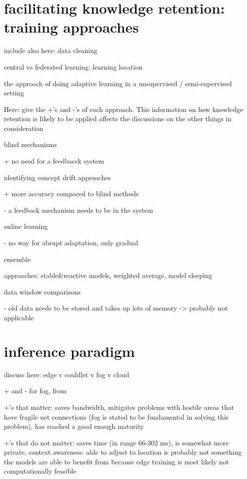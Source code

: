 \section{facilitating knowledge retention: training approaches}

include also here: data cleaning

central vs federated learning: learning location

the approach of doing adaptive learning in a unsupervised / semi-supervised setting

Here: give the +'s and -'s of each approach. This information on how knowledge retention is likely to be applied affects the discussions on the other things in consideration

blind mechanisms

+ no need for a feedbacck system

identifying concept drift approaches

+ more accuracy compared to blind methods \cite{conceptdriftsurvey}

- a feedback mechanism needs to be in the system

online learning

- no way for abrupt adaptation, only gradual \cite{conceptdriftsurvey}

ensemble

approaches: stable&reactive models, weighted average, model sleeping \cite{conceptdriftsurvey}

data window comparisons

- old data needs to be stored and takes up lots of memory \cite{conceptdriftsurvey} -> probably not applicable

\section{inference paradigm}

discuss here: edge v couldlet v fog v cloud

+ and - for fog, from \cite{fogsurvey}

+'s that matter: saves bandwidth, mitigates problems with hostile areas that have fragile net connections (fog is stated to be fundamental in solving this problem), has reached a good enough maturity

+'s that do not matter: saves time (in range 66-302 ms), is somewhat more private, context awareness: able to adjust to location is probably not something the models are able to benefit from because edge training is most likely not computationally feasible

